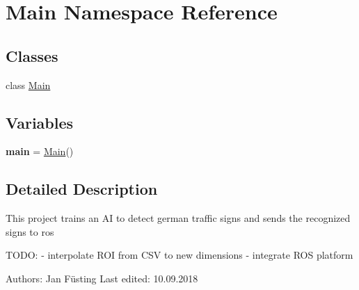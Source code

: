 \hypertarget{namespace_main}{}\section{Main Namespace Reference}
\label{namespace_main}
\subsection*{Classes}
\begin{DoxyCompactItemize}
\item 
class \mbox{\hyperlink{class_main_1_1_main}{Main}}
\end{DoxyCompactItemize}
\subsection*{Variables}
\begin{DoxyCompactItemize}
\item 
\mbox{\label{namespace_main_a273efe7b2fb62996049eaeeb06c8abde}} 
{\bfseries main} = \mbox{\hyperlink{class_main_1_1_main}{Main}}()
\end{DoxyCompactItemize}


\subsection{Detailed Description}
\begin{DoxyVerb}This project trains an AI to detect german traffic signs and sends the recognized signs to ros

TODO:
- interpolate ROI from CSV to new dimensions
- integrate ROS platform

Authors:        Jan Füsting
Last edited:    10.09.2018
\end{DoxyVerb}
 